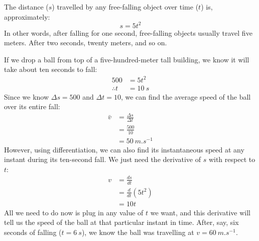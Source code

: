 \documentclass[../main.tex]{subfiles}
\begin{document}
\begin{exmp}
    The distance ($s$) travelled by any free-falling object 
    over time ($t$) is, approximately:
    \[ s = 5t^2 \]
    In other words, after falling for one second, free-falling objects
    usually travel five meters. After two seconds, twenty meters, and so on.

    If we drop a ball from top of a five-hundred-meter tall building, 
    we know it will take about ten seconds to fall:
    \begin{align*}
        500 &= 5t^2\\
        \therefore t &= \SI{10}{s}
    \end{align*}
    Since we know $\Delta s = 500$ and $\Delta t = 10$, we can find 
    the average speed of the ball over its entire fall:
    \begin{align*}
        \bar{v} &= \frac{\Delta s}{\Delta t}\\
                &= \frac{500}{10}\\
                &= \SI{50}{m.s^{-1}}
    \end{align*}
    However, using differentiation, we can also find its 
    instantaneous speed at any instant during its ten-second fall. 
    We just need the derivative of $s$ with respect to $t$:
    \begin{align*}
        v   &= \frac{ds}{dt}\\
            &= \frac{d}{dt} \left( 5t^2 \right)\\
            &= 10t
    \end{align*}
    All we need to do now is plug in any value of $t$ we want, 
    and this derivative will tell us the speed of the ball at that 
    particular instant in time. After, say, six seconds of falling 
    ($t = \SI{6}{s}$), we know the ball was travelling at $v = \SI{60}{m.s^{-1}}$.
\end{exmp}
\end{document}
